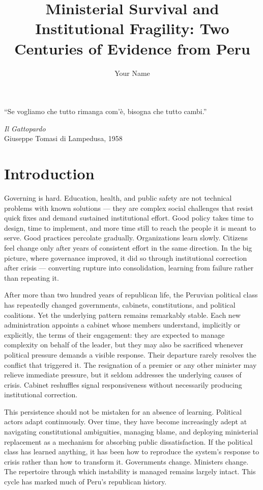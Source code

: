 \documentclass[doc, 12pt, a4paper,floatsintext]{apa7}
\title{Ministerial Survival and Institutional Fragility: Two Centuries of Evidence from Peru}
\author{Your Name} %
\begin{document}
\maketitle 

\epigraph{``Se vogliamo che tutto rimanga com'è, bisogna che tutto cambi.''}
{\textit{Il Gattopardo} \\ Giuseppe Tomasi di Lampedusa, 1958}


\section*{Introduction}

Governing is hard. Education, health, and public safety are not technical
problems with known solutions --- they are complex social challenges that
resist quick fixes and demand sustained institutional effort. Good policy
takes time to design, time to implement, and more time still to reach the
people it is meant to serve. Good practices percolate gradually. Organizations learn slowly.  Citizens feel change only after years of consistent effort in the same direction. In the big picture, where governance improved, it did so through institutional correction after crisis --- converting rupture into consolidation, learning from failure rather than repeating it.

After more than two hundred years of republican life, the Peruvian political class has repeatedly changed governments, cabinets, constitutions, and political coalitions. Yet the underlying pattern remains remarkably stable. Each new administration appoints a cabinet whose members understand, implicitly or explicitly, the terms of their engagement: they are expected to manage complexity on behalf of the leader, but they may also be sacrificed whenever political pressure demands a visible response. Their departure rarely resolves the conflict that triggered it. The resignation of a premier or any other minister may relieve immediate pressure, but it seldom addresses the underlying causes of crisis. Cabinet reshuffles signal responsiveness without necessarily producing institutional correction.

This persistence should not be mistaken for an absence of learning. Political actors adapt continuously. Over time, they have become increasingly adept at navigating constitutional ambiguities, managing blame, and deploying ministerial replacement as a mechanism for absorbing public dissatisfaction. If the political class has learned anything, it has been how to reproduce the system's response to crisis rather than how to transform it. Governments change. Ministers change. The repertoire through which instability is managed remains largely intact. This cycle has marked much of Peru's republican history.
\end{document}
